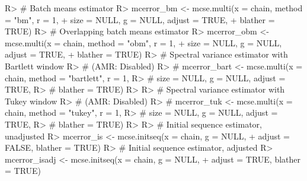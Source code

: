 \documentclass[11pt]{article}
\begin{document}
\begin{Schunk}
\begin{Sinput}
R> # Batch means estimator
R> mcerror_bm <- mcse.multi(x = chain, method =  "bm", r = 1,
+                          size = NULL, g = NULL, adjust = TRUE, 
+                          blather = TRUE)
R> # Overlapping batch means estimator
R> mcerror_obm <- mcse.multi(x = chain, method =  "obm", r = 1,
+                          size = NULL, g = NULL, adjust = TRUE, 
+                          blather = TRUE)
R> # Spectral variance estimator with Bartlett window
R> # (AMR: Disabled)
R> # mcerror_bart <- mcse.multi(x = chain, method =  "bartlett", r = 1,
R> #                           size = NULL, g = NULL, adjust = TRUE, 
R> #                           blather = TRUE)
R> 
R> # Spectral variance estimator with Tukey window
R> # (AMR: Disabled)
R> # mcerror_tuk <- mcse.multi(x = chain, method =  "tukey", r = 1,
R> #                          size = NULL, g = NULL, adjust = TRUE, 
R> #                          blather = TRUE)
R> 
R> # Initial sequence estimator, unadjusted
R> mcerror_is <- mcse.initseq(x = chain, g = NULL, 
+                            adjust = FALSE, blather = TRUE)
R> # Initial sequence estimator, adjusted
R> mcerror_isadj <- mcse.initseq(x = chain, g = NULL, 
+                               adjust = TRUE, blather = TRUE)
\end{Sinput}
\end{Schunk}
\end{document}
